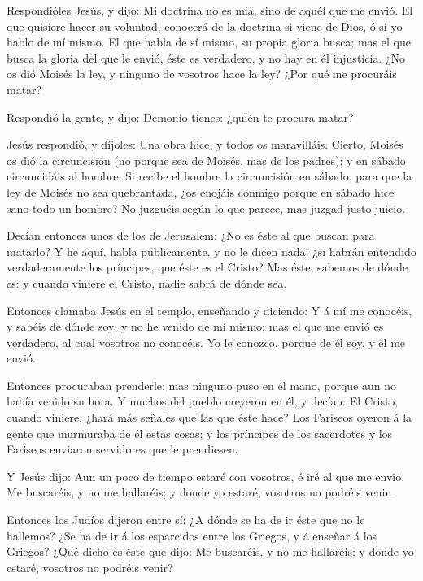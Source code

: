  Respondióles Jesús, y dijo: Mi doctrina no es mía, sino de
aquél que me envió.  El que quisiere hacer su voluntad,
conocerá de la doctrina si viene de Dios, ó si yo hablo de mí mismo.
 El que habla de sí mismo, su propia gloria busca; mas el
que busca la gloria del que le envió, éste es verdadero, y no hay en él
injusticia.  ¿No os dió Moisés la ley, y ninguno de
vosotros hace la ley? ¿Por qué me procuráis matar?

 Respondió la gente, y dijo: Demonio tienes: ¿quién te
procura matar?

 Jesús respondió, y díjoles: Una obra hice, y todos os
maravilláis.  Cierto, Moisés os dió la circuncisión (no
porque sea de Moisés, mas de los padres); y en sábado circuncidáis al
hombre.  Si recibe el hombre la circuncisión en sábado,
para que la ley de Moisés no sea quebrantada, ¿os enojáis conmigo porque
en sábado hice sano todo un hombre?  No juzguéis según lo
que parece, mas juzgad justo juicio.

 Decían entonces unos de los de Jerusalem: ¿No es éste al
que buscan para matarlo?  Y he aquí, habla públicamente, y
no le dicen nada; ¿si habrán entendido verdaderamente los príncipes, que
éste es el Cristo?  Mas éste, sabemos de dónde es: y cuando
viniere el Cristo, nadie sabrá de dónde sea.

 Entonces clamaba Jesús en el templo, enseñando y diciendo:
Y á mí me conocéis, y sabéis de dónde soy; y no he venido de mí mismo;
mas el que me envió es verdadero, al cual vosotros no conocéis.
 Yo le conozco, porque de él soy, y él me envió.

 Entonces procuraban prenderle; mas ninguno puso en él
mano, porque aun no había venido su hora.  Y muchos del
pueblo creyeron en él, y decían: El Cristo, cuando viniere, ¿hará más
señales que las que éste hace?  Los Fariseos oyeron á la
gente que murmuraba de él estas cosas; y los príncipes de los sacerdotes
y los Fariseos enviaron servidores que le prendiesen.

 Y Jesús dijo: Aun un poco de tiempo estaré con vosotros, é
iré al que me envió.  Me buscaréis, y no me hallaréis; y
donde yo estaré, vosotros no podréis venir.

 Entonces los Judíos dijeron entre sí: ¿A dónde se ha de ir
éste que no le hallemos? ¿Se ha de ir á los esparcidos entre los
Griegos, y á enseñar á los Griegos?  ¿Qué dicho es éste que
dijo: Me buscaréis, y no me hallaréis; y donde yo estaré, vosotros no
podréis venir?

